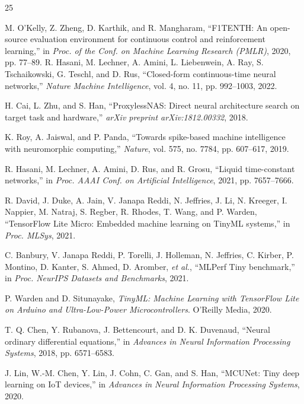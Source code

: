 \documentclass[conference]{IEEEtran}
\begin{document}
\begin{thebibliography}{25}

 M. O'Kelly, Z. Zheng, D. Karthik, and R. Mangharam, ``F1TENTH: An open-source evaluation environment for continuous control and reinforcement learning,'' in \textit{Proc. of the Conf. on Machine Learning Research (PMLR)}, 2020, pp. 77--89.
 R. Hasani, M. Lechner, A. Amini, L. Liebenwein, A. Ray, S. Tschaikowski, G. Teschl, and D. Rus, ``Closed-form continuous-time neural networks,'' \textit{Nature Machine Intelligence}, vol. 4, no. 11, pp. 992--1003, 2022.

 H. Cai, L. Zhu, and S. Han, ``ProxylessNAS: Direct neural architecture search on target task and hardware,'' \textit{arXiv preprint arXiv:1812.00332}, 2018.

 K. Roy, A. Jaiswal, and P. Panda, ``Towards spike-based machine intelligence with neuromorphic computing,'' \textit{Nature}, vol. 575, no. 7784, pp. 607--617, 2019.

 R. Hasani, M. Lechner, A. Amini, D. Rus, and R. Grosu, ``Liquid time-constant networks,'' in \textit{Proc. AAAI Conf. on Artificial Intelligence}, 2021, pp. 7657--7666.

 R. David, J. Duke, A. Jain, V. Janapa Reddi, N. Jeffries, J. Li, N. Kreeger, I. Nappier, M. Natraj, S. Regber, R. Rhodes, T. Wang, and P. Warden, ``TensorFlow Lite Micro: Embedded machine learning on TinyML systems,'' in \textit{Proc. MLSys}, 2021.

 C. Banbury, V. Janapa Reddi, P. Torelli, J. Holleman, N. Jeffries, C. Kirber, P. Montino, D. Kanter, S. Ahmed, D. Aromber, \textit{et al.}, ``MLPerf Tiny benchmark,'' in \textit{Proc. NeurIPS Datasets and Benchmarks}, 2021.

 P. Warden and D. Situnayake, \textit{TinyML: Machine Learning with TensorFlow Lite on Arduino and Ultra-Low-Power Microcontrollers}. O'Reilly Media, 2020.

 T. Q. Chen, Y. Rubanova, J. Bettencourt, and D. K. Duvenaud, ``Neural ordinary differential equations,'' in \textit{Advances in Neural Information Processing Systems}, 2018, pp. 6571--6583.

 J. Lin, W.-M. Chen, Y. Lin, J. Cohn, C. Gan, and S. Han, ``MCUNet: Tiny deep learning on IoT devices,'' in \textit{Advances in Neural Information Processing Systems}, 2020.


\end{thebibliography}
\end{document}
